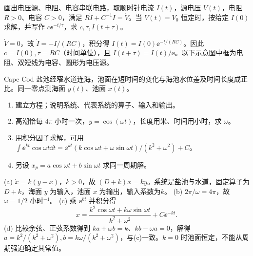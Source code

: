 \begin{exercise}\label{cw:rec03-6}
画出电压源、电阻、电容串联电路，取顺时针电流 $I(t)$，源电压 $V(t)$，电阻 $R>0$、电容 $C>0$，满足 $R\dot I+C^{-1}I=\dot V$。当 $V(t)=V_0$ 恒定时，按给定 $I(0)$ 求解，并写作 $c\ee^{-t/\tau}$，求 $c,\tau,I(t+\tau)$。
\end{exercise}
\begin{solution}
$\dot V=0$，故 $\dot I=-I/(RC)$，积分得 $I(t)=I(0)\ee^{-t/(RC)}$。因此 $c=I(0),\tau=RC$（时间单位），且 $I(t+\tau)=I(t)/\ee$。以下示意图中框为电阻、双短线为电容、圆形为电压源。\begin{center}\end{center}
\par{}
\end{solution}

\begin{exercise}\label{cw:rec04-1}
Cape Cod 盐池经窄水道连海，池面在短时间的变化与海池水位差及时间长度成正比。同一零点测海面 $y(t)$、池面 $x(t)$。
\begin{enumerate}[label=(\alph*)]\item 建立方程；说明系统、代表系统的算子、输入和输出。\item 高潮恰每 $4\pi$ 小时一次，$y=\cos(\omega t)$，长度用米、时间用小时，求 $\omega$。\item 用积分因子求解，可用 $\int\ee^{kt}\cos\omega t\dd t=\ee^{kt}(k\cos\omega t+\omega\sin\omega t)/(k^2+\omega^2)+C$。\item 另设 $x_p=a\cos\omega t+b\sin\omega t$ 求同一周期解。\end{enumerate}
\end{exercise}
\begin{solution}
(a) $\dot x=k(y-x)$，$k>0$，故 $(D+k)x=ky$。系统是盐池与水道，固定算子为 $D+k$，海面 $y$ 为输入，池面 $x$ 为输出，输入系数为$k$。
(b) $2\pi/\omega=4\pi$，故 $\omega=1/2$ 小时$^{-1}$。
(c) 乘 $\ee^{kt}$ 并积分得
\[x=\frac{k^2\cos\omega t+k\omega\sin\omega t}{k^2+\omega^2}+C\ee^{-kt}.
\]
(d) 比较余弦、正弦系数得到 $ka+\omega b=k$、$kb-\omega a=0$，解得 $a=k^2/(k^2+\omega^2),b=k\omega/(k^2+\omega^2)$，与(c)一致。$k=0$ 时池面恒定，不能从周期强迫确定其常值。
\par{}
\end{solution}

